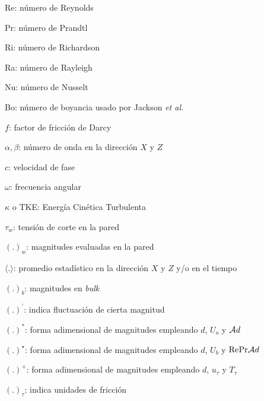 \documentclass[12pt,screen,twoside]{ibtesis}
\begin{document}
\begin{preliminary}
\begin{abreviaturas}
\begin{itemize}
{{\item[] Re: número de Reynolds
\item[] Pr: número de Prandtl
\item[] Ri: número de Richardson
\item[] Ra: número de Rayleigh
\item[] Nu: número de Nusselt
\item[] Bo: número de boyancia usado por Jackson \textit{et al.} \cite{jackson1989studies}
\item[] $f$: factor de fricción de Darcy


\item[] $\alpha,\beta$: número de onda en la dirección $X$ y $Z$ 
\item[] $c$: velocidad de fase
\item[] $\omega$: frecuencia angular

\item[] $\kappa$ o TKE: Energía Cinética Turbulenta

\item[] $\tau_w$: tensión de corte en la pared 

\item[] $(\text{.})_w$: magnitudes evaluadas en la pared
\item[] $\langle \text{.} \rangle$: promedio estadístico en la dirección $X$ y $Z$ y/o en el tiempo
\item[] $(\text{.})_b$: magnitudes en \textit{bulk}
\item[] $(\text{.})^{\prime}$: indica fluctuación de cierta magnitud

\item[] $(\text{.})^{*}$: forma adimensional de magnitudes empleando $d$, $U_o$ y $\mathcal{A} \hspace{0.1mm} d$ 
\item[] $(\text{.})^{\star}$: forma adimensional de magnitudes empleando $d$, $U_b$ y $\text{Re} \hspace{0.1mm} \text{Pr} \hspace{0.1mm} \mathcal{A} \hspace{0.1mm} d $ 
\item[] $(\text{.})^{+}$: forma adimensional de magnitudes empleando $d$, $u_{\tau}$ y $T_{\tau}$
\item[] $(\text{.})_{\tau}$: indica unidades de fricción




}}
\end{itemize}
\end{abreviaturas}
\end{preliminary}
\end{document}
